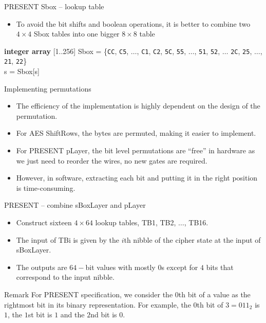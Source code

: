 \begin{frame}{PRESENT Sbox -- lookup table}
    \begin{itemize}
        \item To avoid the bit shifts and boolean operations, it is better to combine two $4\times4$ Sbox tables into one bigger $8\times8$ table
    \end{itemize}
\begin{algorithm}[H]
	\textbf{integer array} [1..256] Sbox = \{\texttt{CC}, \texttt{C5}, $\dots$, \texttt{C1}, \texttt{C2}, \texttt{5C}, \texttt{55}, $\dots$, \texttt{51}, \texttt{52}, $\dots$ \texttt{2C}, \texttt{25}, $\dots$, \texttt{21}, \texttt{22}\}\\
 s = Sbox[s] 
\caption{A lookup table implementation combining two PRESENT Sboxes in parallel in pseudocode.}
\end{algorithm}
\end{frame}

\begin{frame}{Implementing permutations}
    \begin{itemize}
        \item The efficiency of the implementation is highly dependent on the design of the permutation.
        \item For AES ShiftRows, the bytes are permuted, making it easier to implement.
        \item For PRESENT pLayer, the bit level permutations are ``free'' in hardware as we just need to reorder the wires, no new gates are required.
        \item However, in software, extracting each bit and putting it in the right position is time-consuming.
    \end{itemize}
\end{frame}

\begin{frame}{PRESENT -- combine sBoxLayer and pLayer}
    \begin{itemize}
        \item Construct sixteen $4\times64$ lookup tables, TB1, TB2, $\dots$, TB16.
       \item The input of TBi is given by the $i$th nibble of the cipher state at the input of sBoxLayer.
       \item The outputs are $64-$bit values with mostly $0$s except for $4$ bits that correspond to the input nibble.
    \end{itemize}
\begin{alertblock}{Remark}
For PRESENT specification, we consider the $0$th bit of a value as the rightmost bit in its binary representation.
For example, the $0$th bit of $3=011_2$ is $1$, the $1$st bit is $1$ and the $2$nd bit is $0$.
\end{alertblock}
\end{frame}

